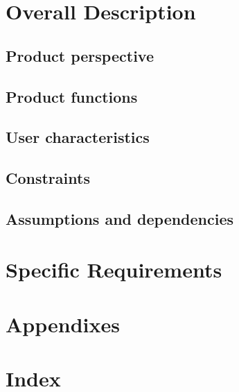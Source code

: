 \documentclass[10pt,letterpaper,onecolumn,draftclsnofoot]{IEEEtran}
\begin{document}
\section{Overall Description}

\subsection{Product perspective}

\subsection{Product functions}

\subsection{User characteristics}

\subsection{Constraints}

\subsection{Assumptions and dependencies}

\section{Specific Requirements}

\clearpage
\section{Appendixes}

\section{Index}
\end{document}

